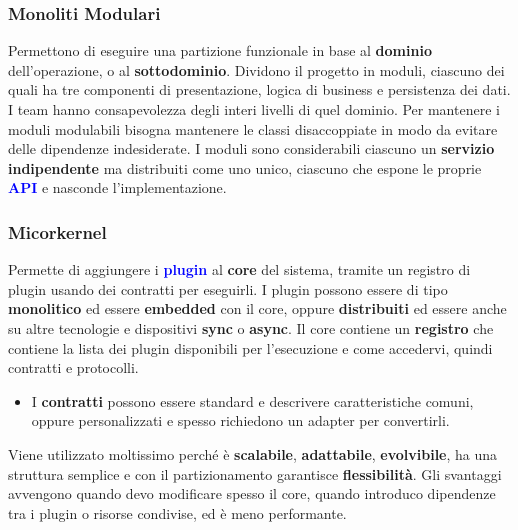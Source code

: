 \subsubsection{Monoliti Modulari} 
Permettono di eseguire una partizione funzionale in base al \textbf{dominio} dell'operazione, o al \textbf{sottodominio}. Dividono il progetto in moduli, ciascuno dei quali ha tre componenti di presentazione, logica di business e persistenza dei dati. I team hanno consapevolezza degli interi livelli di quel dominio.
Per mantenere i moduli modulabili bisogna mantenere le classi disaccoppiate in modo da evitare delle dipendenze indesiderate. I moduli sono considerabili ciascuno un \textbf{servizio indipendente} ma distribuiti come uno unico, ciascuno che espone le proprie \textbf{\textcolor{blue}{API}} e nasconde l'implementazione.

\subsubsection{Micorkernel} 
Permette di aggiungere i \textbf{\textcolor{blue}{plugin}} al \textbf{core} del sistema, tramite un registro di plugin usando dei contratti per eseguirli.
I plugin possono essere di tipo \textbf{monolitico} ed essere \textbf{embedded} con il core, oppure \textbf{distribuiti} ed essere anche su altre tecnologie e dispositivi \textbf{sync} o \textbf{async}.
Il core contiene un \textbf{registro} che contiene la lista dei plugin disponibili per l'esecuzione e come accedervi, quindi contratti e protocolli.
\begin{itemize}
    \item I \textbf{contratti} possono essere standard e descrivere caratteristiche comuni, oppure personalizzati e spesso richiedono un adapter per convertirli.
\end{itemize}
Viene utilizzato moltissimo perché è \textbf{scalabile}, \textbf{adattabile}, \textbf{evolvibile}, ha una struttura semplice e con il partizionamento garantisce \textbf{flessibilità}.
Gli svantaggi avvengono quando devo modificare spesso il core, quando introduco dipendenze tra i plugin o risorse condivise, ed è meno performante.


